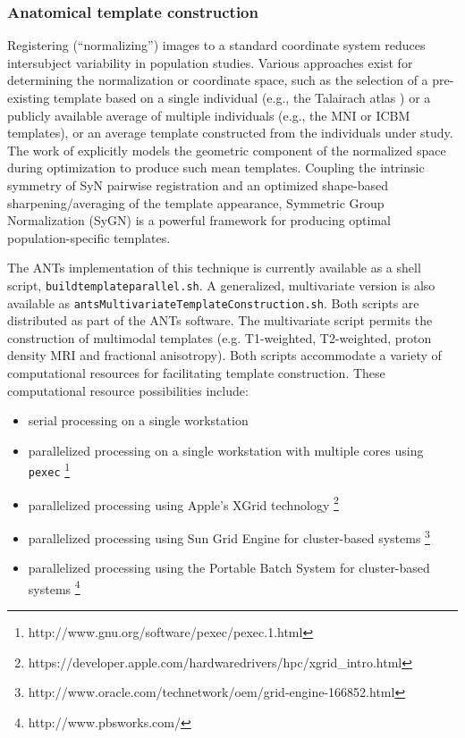 \subsubsection{Anatomical template construction}

Registering (``normalizing'') images to a standard coordinate system
reduces intersubject variability in population studies.  Various
approaches exist for determining the normalization or coordinate space,
such as the selection of a pre-existing template based on a single individual
(e.g., the Talairach atlas \citep{Talairach1988}) or a publicly available average of multiple individuals
(e.g., the MNI \citep{Collins1994} or ICBM \citep{Mazziotta1995}
templates), or an average template constructed from the individuals under study.
The work of \cite{avants2010} explicitly models the geometric component of the 
normalized space during optimization to produce such mean templates.  Coupling the intrinsic symmetry of 
SyN pairwise registration \citep{avants2011} and an
optimized shape-based sharpening/averaging of the template appearance, Symmetric Group Normalization (SyGN) is a powerful framework for producing optimal population-specific templates.

The ANTs implementation of this technique is currently available as a shell script, 
{\tt buildtemplateparallel.sh}.  A generalized, multivariate version is also available as
{\tt antsMultivariateTemplateConstruction.sh}.  Both scripts are distributed as part of
 the ANTs software.  
The multivariate script permits the construction of multimodal templates
(e.g. T1-weighted, T2-weighted, proton density MRI and fractional anisotropy).
Both scripts accommodate a variety of computational resources
for facilitating template construction.  These computational resource possibilities include:
\begin{itemize}
  \item serial processing on a single workstation
  \item parallelized processing on a single workstation with multiple cores using \verb#pexec#%
  \footnote{http://www.gnu.org/software/pexec/pexec.1.html}
  \item parallelized processing using Apple's XGrid technology%
  \footnote{https://developer.apple.com/hardwaredrivers/hpc/xgrid\_intro.html}
  \item parallelized processing using Sun Grid Engine for cluster-based systems%
  \footnote{http://www.oracle.com/technetwork/oem/grid-engine-166852.html}
  \item parallelized processing using the Portable Batch System for cluster-based systems%
  \footnote{http://www.pbsworks.com/}
\end{itemize}

